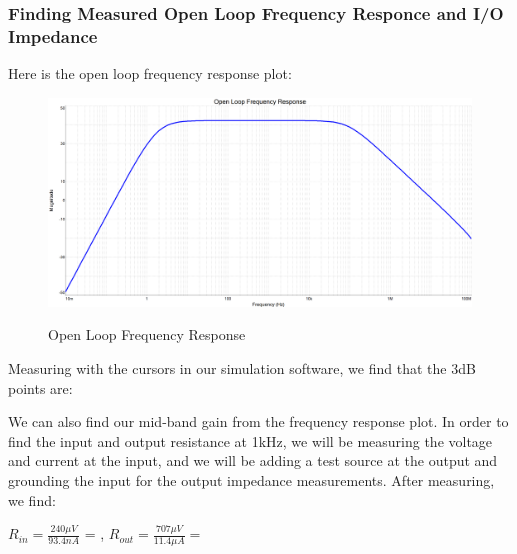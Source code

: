 \documentclass[12pt]{article}
\begin{document}
\subsubsection{Finding Measured Open Loop Frequency Responce and I/O Impedance}
Here is the open loop frequency response plot:
\begin{figure}[h!]
    \centering
    \includegraphics[height=0.45\textwidth]{Images/partCbode.png}\\
    \caption{Open Loop Frequency Response}
    \label{fig:olfreqresponse}
\end{figure}
\FloatBarrier
Measuring with the cursors in our simulation software, we find that the 
3dB points are: 
\begin{center}
\end{center}
We can also find our mid-band gain  from the frequency 
response plot.
In order to find the input and output resistance at 1kHz, we will be measuring the voltage 
and current at the input, and we will be adding a test source at the output and grounding the
input for the output impedance measurements. After measuring, we find: 
\begin{center}
$R_{in} = \frac{240\mu V}{93.4nA}$ = , 
$R_{out} = \frac{707\mu V}{11.4 \mu A} = $ \boxed{62.017\Omega}
\end{center}
\end{document}
